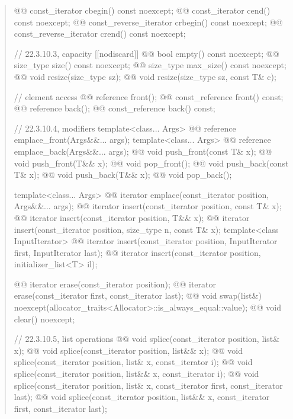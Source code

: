 \documentclass{wg21}
\begin{document}
\begin{quote}
\begin{codeblock}
{{    @@ const_iterator         cbegin() const noexcept;
    @@ const_iterator         cend() const noexcept;
    @@ const_reverse_iterator crbegin() const noexcept;
    @@ const_reverse_iterator crend() const noexcept;

    // 22.3.10.3, capacity
    [[nodiscard]] @@ bool empty() const noexcept;
    @@ size_type size() const noexcept;
    @@ size_type max_size() const noexcept;
    @@ void      resize(size_type sz);
    @@ void      resize(size_type sz, const T& c);

    // element access
    @@ reference       front();
    @@ const_reference front() const;
    @@ reference       back();
    @@ const_reference back() const;

    // 22.3.10.4, modifiers
    template<class... Args> @@ reference emplace_front(Args&&... args);
    template<class... Args> @@ reference emplace_back(Args&&... args);
    @@ void push_front(const T& x);
    @@ void push_front(T&& x);
    @@ void pop_front();
    @@ void push_back(const T& x);
    @@ void push_back(T&& x);
    @@ void pop_back();

    template<class... Args> @@ iterator emplace(const_iterator position, Args&&... args);
    @@ iterator insert(const_iterator position, const T& x);
    @@ iterator insert(const_iterator position, T&& x);
    @@ iterator insert(const_iterator position, size_type n, const T& x);
    template<class InputIterator>
    @@ iterator insert(const_iterator position, InputIterator first, InputIterator last);
    @@ iterator insert(const_iterator position, initializer_list<T> il);
    
    @@ iterator erase(const_iterator position);
    @@ iterator erase(const_iterator first, const_iterator last);
    @@ void     swap(list&)
      noexcept(allocator_traits<Allocator>::is_always_equal::value);
    @@ void     clear() noexcept;
    
    // 22.3.10.5, list operations
    @@ void splice(const_iterator position, list& x);
    @@ void splice(const_iterator position, list&& x);
    @@ void splice(const_iterator position, list& x, const_iterator i);
    @@ void splice(const_iterator position, list&& x, const_iterator i);
    @@ void splice(const_iterator position, list& x, const_iterator first, const_iterator last);
    @@ void splice(const_iterator position, list&& x, const_iterator first, const_iterator last);
    
}}
\end{codeblock}
\end{quote}
\end{document}
